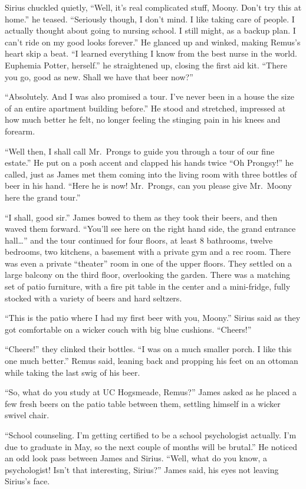\documentclass[12pt,twoside,openright]{memoir}
\begin{document}
Sirius chuckled quietly, ``Well, it's real complicated stuff, Moony. Don't try this at home.'' he teased. ``Seriously though, I don't mind. I like taking care of people. I actually thought about going to nursing school. I still might, as a backup plan. I can't ride on my good looks forever.'' He glanced up and winked, making Remus's heart skip a beat. ``I learned everything I know from the best nurse in the world. Euphemia Potter, herself.'' he straightened up, closing the first aid kit. ``There you go, good as new. Shall we have that beer now?''

``Absolutely. And I was also promised a tour. I've never been in a house the size of an entire apartment building before.'' He stood and stretched, impressed at how much better he felt, no longer feeling the stinging pain in his knees and forearm.

``Well then, I shall call Mr.\ Prongs to guide you through a tour of our fine estate.'' He put on a posh accent and clapped his hands twice ``Oh Prongsy!'' he called, just as James met them coming into the living room with three bottles of beer in his hand. ``Here he is now! Mr.\ Prongs, can you please give Mr.\ Moony here the grand tour.''

``I shall, good sir.'' James bowed to them as they took their beers, and then waved them forward. ``You'll see here on the right hand side, the grand entrance hall…'' and the tour continued for four floors, at least 8 bathrooms, twelve bedrooms, two kitchens, a basement with a private gym and a rec room. There was even a private ``theater'' room in one of the upper floors. They settled on a large balcony on the third floor, overlooking the garden. There was a matching set of patio furniture, with a fire pit table in the center and a mini-fridge, fully stocked with a variety of beers and hard seltzers.

``This is the patio where I had my first beer with you, Moony.'' Sirius said as they got comfortable on a wicker couch with big blue cushions. ``Cheers!''

``Cheers!'' they clinked their bottles. ``I was on a much smaller porch. I like this one much better.'' Remus said, leaning back and propping his feet on an ottoman while taking the last swig of his beer.

``So, what do you study at UC Hogsmeade, Remus?'' James asked as he placed a few fresh beers on the patio table between them, settling himself in a wicker swivel chair.

``School counseling. I'm getting certified to be a school psychologist actually. I'm due to graduate in May, so the next couple of months will be brutal.'' He noticed an odd look pass between James and Sirius. ``Well, what do you know, a psychologist! Isn't that interesting, Sirius?'' James said, his eyes not leaving Sirius's face.
\end{document}
